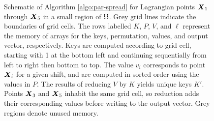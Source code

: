 \begin{figure}[tb]
\begin{center}

    \end{center}

    \caption{%
        Schematic of Algorithm \ref{algo:par-spread} for Lagrangian points
        $\boldsymbol{X}_1$ through $\boldsymbol{X}_5$ in a small region of $\Omega$. Grey grid lines
        indicate the boundaries of grid cells. The rows labelled $K$, $P$, $V$,
        and $\ell$ represent the memory of arrays for the keys, permutation,
        values, and output vector, respectively. Keys are computed according to
        grid cell, starting with 1 at the bottom left and continuing
        sequentially from left to right then bottom to top. The value $v_i$
        corresponds to point $\boldsymbol{X}_i$ for a given shift, and are computed in
        sorted order using the values in $P$. The results of reducing $V$ by
        $K$ yields unique keys $K'$. Points $\boldsymbol{X}_3$ and $\boldsymbol{X}_5$ inhabit the same
        grid cell, so reduction adds their corresponding values before writing
        to the output vector. Grey regions denote unused memory.
    }
    \label{fig:algo}
\end{figure}
